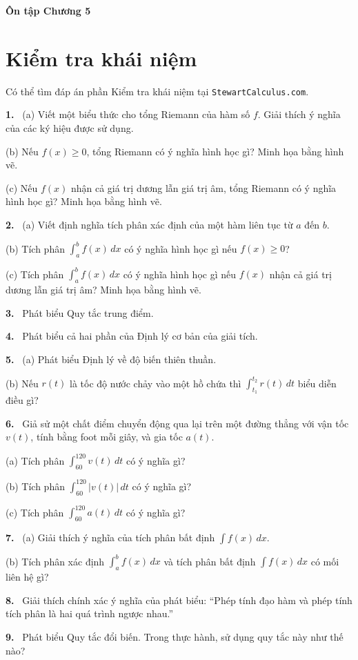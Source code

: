 \documentclass[12pt,a4paper]{article}
\newcommand{\bt}[1]{\par\smallskip\Needspace{5\baselineskip}\noindent\textbf{#1.}\ }
\newcommand{\cc}[1]{\bt{#1}}
\begin{document}
\begin{center}{\LARGE\bfseries Ôn tập Chương 5}\end{center}

\section*{Kiểm tra khái niệm}
\noindent Có thể tìm đáp án phần Kiểm tra khái niệm tại \texttt{StewartCalculus.com}.

\cc{1} (a) Viết một biểu thức cho tổng Riemann của hàm số $f$. Giải thích ý nghĩa của các ký hiệu được sử dụng.
\par\noindent(b) Nếu $f(x)\ge0$, tổng Riemann có ý nghĩa hình học gì? Minh họa bằng hình vẽ.
\par\noindent(c) Nếu $f(x)$ nhận cả giá trị dương lẫn giá trị âm, tổng Riemann có ý nghĩa hình học gì? Minh họa bằng hình vẽ.
\cc{2} (a) Viết định nghĩa tích phân xác định của một hàm liên tục từ $a$ đến $b$.
\par\noindent(b) Tích phân $\int_a^bf(x)\,dx$ có ý nghĩa hình học gì nếu $f(x)\ge0$?
\par\noindent(c) Tích phân $\int_a^bf(x)\,dx$ có ý nghĩa hình học gì nếu $f(x)$ nhận cả giá trị dương lẫn giá trị âm? Minh họa bằng hình vẽ.
\cc{3} Phát biểu Quy tắc trung điểm.
\cc{4} Phát biểu cả hai phần của Định lý cơ bản của giải tích.
\cc{5} (a) Phát biểu Định lý về độ biến thiên thuần.
\par\noindent(b) Nếu $r(t)$ là tốc độ nước chảy vào một hồ chứa thì $\int_{t_1}^{t_2}r(t)\,dt$ biểu diễn điều gì?
\cc{6} Giả sử một chất điểm chuyển động qua lại trên một đường thẳng với vận tốc $v(t)$, tính bằng foot mỗi giây, và gia tốc $a(t)$.
\par\noindent(a) Tích phân $\int_{60}^{120}v(t)\,dt$ có ý nghĩa gì?
\par\noindent(b) Tích phân $\int_{60}^{120}|v(t)|\,dt$ có ý nghĩa gì?
\par\noindent(c) Tích phân $\int_{60}^{120}a(t)\,dt$ có ý nghĩa gì?
\cc{7} (a) Giải thích ý nghĩa của tích phân bất định $\int f(x)\,dx$.
\par\noindent(b) Tích phân xác định $\int_a^bf(x)\,dx$ và tích phân bất định $\int f(x)\,dx$ có mối liên hệ gì?
\cc{8} Giải thích chính xác ý nghĩa của phát biểu: ``Phép tính đạo hàm và phép tính tích phân là hai quá trình ngược nhau.''
\cc{9} Phát biểu Quy tắc đổi biến. Trong thực hành, sử dụng quy tắc này như thế nào?
\end{document}
